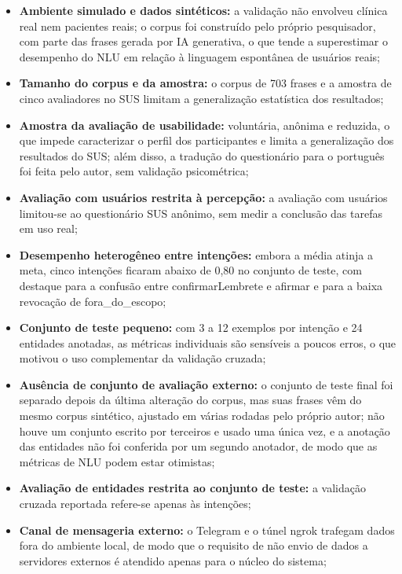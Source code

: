 \documentclass[12pt,a4paper]{extarticle}
\begin{document}
\begin{itemize}
    \item \textbf{Ambiente simulado e dados sintéticos:} a validação não envolveu clínica real nem pacientes reais; o corpus foi construído pelo próprio pesquisador, com parte das frases gerada por IA generativa, o que tende a superestimar o desempenho do NLU em relação à linguagem espontânea de usuários reais;
    \item \textbf{Tamanho do corpus e da amostra:} o corpus de 703 frases e a amostra de cinco avaliadores no SUS limitam a generalização estatística dos resultados;
    \item \textbf{Amostra da avaliação de usabilidade:} voluntária, anônima e reduzida, o que impede caracterizar o perfil dos participantes e limita a generalização dos resultados do SUS; além disso, a tradução do questionário para o português foi feita pelo autor, sem validação psicométrica;
    \item \textbf{Avaliação com usuários restrita à percepção:} a avaliação com usuários limitou-se ao questionário SUS anônimo, sem medir a conclusão das tarefas em uso real;
    \item \textbf{Desempenho heterogêneo entre intenções:} embora a média atinja a meta, cinco intenções ficaram abaixo de 0,80 no conjunto de teste, com destaque para a confusão entre confirmarLembrete e afirmar e para a baixa revocação de fora\_\allowbreak{}do\_\allowbreak{}escopo;
    \item \textbf{Conjunto de teste pequeno:} com 3 a 12 exemplos por intenção e 24 entidades anotadas, as métricas individuais são sensíveis a poucos erros, o que motivou o uso complementar da validação cruzada;
    \item \textbf{Ausência de conjunto de avaliação externo:} o conjunto de teste final foi separado depois da última alteração do corpus, mas suas frases vêm do mesmo corpus sintético, ajustado em várias rodadas pelo próprio autor; não houve um conjunto escrito por terceiros e usado uma única vez, e a anotação das entidades não foi conferida por um segundo anotador, de modo que as métricas de NLU podem estar otimistas;
    \item \textbf{Avaliação de entidades restrita ao conjunto de teste:} a validação cruzada reportada refere-se apenas às intenções;
    \item \textbf{Canal de mensageria externo:} o Telegram e o túnel ngrok trafegam dados fora do ambiente local, de modo que o requisito de não envio de dados a servidores externos é atendido apenas para o núcleo do sistema;

\end{itemize}
\end{document}
